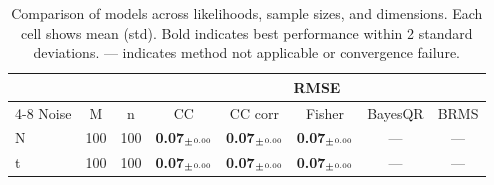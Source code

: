 
\begin{table}[htbp]
\centering
\begin{tabular}{lccccccc}
\toprule
\multicolumn{3}{c}{} & \multicolumn{5}{c}{RMSE} \\
\cmidrule(lr){4-8}
Noise & M & n & \multicolumn{1}{c}{CC} & \multicolumn{1}{c}{CC corr} & \multicolumn{1}{c}{Fisher} & \multicolumn{1}{c}{BayesQR} & \multicolumn{1}{c}{BRMS} \\
\midrule
N & 100 & 100 & \textbf{0.07$_\pm{\text{\tiny 0.00}}$} & \textbf{0.07$_\pm{\text{\tiny 0.00}}$} & \textbf{0.07$_\pm{\text{\tiny 0.00}}$} & --- & --- \\
t & 100 & 100 & \textbf{0.07$_\pm{\text{\tiny 0.00}}$} & \textbf{0.07$_\pm{\text{\tiny 0.00}}$} & \textbf{0.07$_\pm{\text{\tiny 0.00}}$} & --- & --- \\

\bottomrule
\end{tabular}
\caption{Comparison of models across likelihoods, sample sizes, and dimensions. Each cell shows mean (std). Bold indicates best performance within 2 standard deviations. --- indicates method not applicable or convergence failure.}
\label{tab:model_comparison}
\end{table}